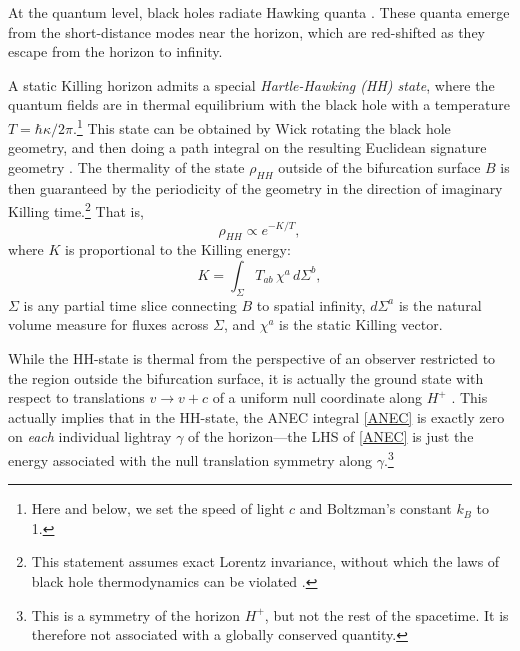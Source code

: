 \documentclass[12pt,a4paper]{article}
\def\be{\begin{equation}}
\def\ee{\end{equation}}
\begin{document}
At the quantum level, black holes radiate Hawking quanta \cite{hawking1975particle}.  These quanta emerge from the short-distance modes near the horizon, which are red-shifted as they escape from the horizon to infinity.

A static Killing horizon admits a special \emph{Hartle-Hawking (HH) state}, where the quantum fields are in thermal equilibrium with the black hole with a temperature $T = \hbar \kappa / 2 \pi$.\footnote{Here and below, we set the speed of light $c$ and Boltzman's constant $k_B$ to 1.}  This state can be obtained by Wick rotating the black hole geometry, and then doing a path integral on the resulting Euclidean signature geometry \cite{hartle1976path,israel1976thermo}.  The thermality of the state $\rho_{HH}$ outside of the bifurcation surface $B$ is then guaranteed by the periodicity of the geometry in the direction of imaginary Killing time.\footnote{This statement assumes exact Lorentz invariance, without which the laws of black hole thermodynamics can be violated \cite{Dubovsky:2006vk,Eling:2007qd,Jacobson:2008yc}.}  That is,
\be\label{thermal}
\rho_{HH} \propto e^{-K / T},
\ee
where $K$ is proportional to the Killing energy:
\be\label{KillingK}
K = \int_\Sigma T_{ab}\,\chi^a\,d\Sigma^b,
\ee
$\Sigma$ is any partial time slice connecting $B$ to spatial infinity, $d\Sigma^a$ is the natural volume measure for fluxes across $\Sigma$, and $\chi^a$ is the static Killing vector.

While the HH-state is thermal from the perspective of an observer restricted to the region outside the bifurcation surface, it is actually the ground state with respect to translations $v \to v + c$ of a uniform null coordinate along $H^+$  \cite{israel1976thermo,fulling1977alternative,sewell,kay1991theorems}.  This actually implies that in the HH-state, the ANEC integral \eqref{ANEC} is exactly zero on \emph{each} individual lightray $\gamma$ of the horizon---the LHS of \eqref{ANEC} is just the energy associated with the null translation symmetry along $\gamma$.\footnote{This is a symmetry of the horizon $H^{+}$, but not the rest of the spacetime.  It is therefore not associated with a globally conserved quantity.}
\end{document}
